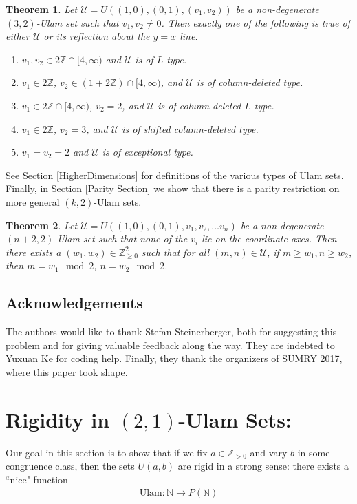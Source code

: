 \documentclass{amsart}
\newcommand{\NN}{\mathbb{N}}
\newcommand{\ZZ}{\mathbb{Z}}
\newcommand{\U}{\mathcal{U}}
\theoremstyle{theorem}
\newtheorem{theorem}{Theorem}[section]
\theoremstyle{definition}
\begin{document}
\begin{theorem}
Let $\U = U\left((1,0), (0,1), (v_1, v_2)\right)$ be a non-degenerate $(3,2)$-Ulam set such that $v_1, v_2 \neq 0$. Then exactly one of the following is true of either $\U$ or its reflection about the $y = x$ line.
\begin{enumerate}
	\item $v_1, v_2 \in 2\ZZ \cap [4,\infty)$ and $\U$ is of $L$ type.
    \item $v_1 \in 2\ZZ$, $v_2 \in \left(1 + 2\ZZ\right) \cap [4,\infty)$, and $\U$ is of column-deleted type.
    \item $v_1 \in 2\ZZ \cap [4,\infty)$, $v_2 = 2$, and $\U$ is of column-deleted $L$ type.
    \item $v_1 \in 2\ZZ$, $v_2 = 3$, and $\U$ is of shifted column-deleted type.
    \item $v_1 = v_2 = 2$ and $\U$ is of exceptional type.
\end{enumerate}
\end{theorem}

See Section \ref{HigherDimensions} for definitions of the various types of Ulam sets. Finally, in Section \ref{Parity Section} we show that there is a parity restriction on more general $(k,2)$-Ulam sets.

\begin{theorem}
Let $\U = U\left((1,0),(0,1),v_1, v_2, \ldots v_n\right)$ be a non-degenerate $(n + 2, 2)$-Ulam set such that none of the $v_i$ lie on the coordinate axes. Then there exists a $(w_1, w_2) \in \ZZ_{\geq 0}^2$ such that for all $(m,n) \in \U$, if $m \geq w_1, n \geq w_2$, then $m = w_1 \mod 2$, $n = w_2 \mod 2$.
\end{theorem}

\subsection*{Acknowledgements} The authors would like to thank Stefan Steinerberger, both for suggesting this problem and for giving valuable feedback along the way. They are indebted to Yuxuan Ke for coding help. Finally, they thank the organizers of SUMRY 2017, where this paper took shape.

\section{Rigidity in $(2,1)$-Ulam Sets:}\label{Rigidity Section}
Our goal in this section is to show that if we fix $a \in \ZZ_{> 0}$ and vary $b$ in some congruence class, then the sets $U(a,b)$ are rigid in a strong sense: there exists a ``nice" function
	\begin{align*}
    \text{Ulam}: \NN \rightarrow P(\NN)
    \end{align*}
    
\end{document}
